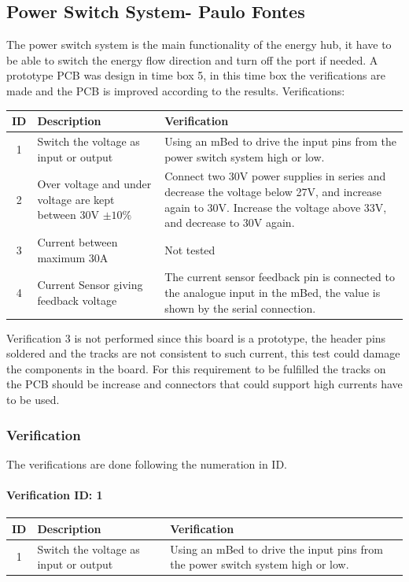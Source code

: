 \subsection{Power Switch System- Paulo Fontes}
The power switch system is the main functionality of the energy hub, it have to be able to switch the energy flow direction and turn off the port if needed. A prototype PCB was design in time box 5, in this time box the verifications are made and the PCB is improved according to the results.
\p
Verifications:
\begin{table}[H]
\centering
	\begin{tabular}{| c | l | p{7cm} | }
		\hline
		ID & Description & Verification \\\hline
		1 & Switch the voltage as input or output & Using an mBed to drive the input pins from the power switch system high or low. \\\hline
		2 & Over voltage and under voltage are kept between 30V $ \pm10\% $ & Connect two 30V power supplies in series and decrease the voltage below 27V, and increase again to 30V. Increase the voltage above 33V, and decrease to 30V again. \\\hline
		3 & Current between maximum 30A & Not tested \\\hline
		4 & Current Sensor giving feedback voltage & The current sensor feedback pin is connected to the analogue input in the mBed, the value is shown by the serial connection. \\\hline
	\end{tabular}
\end{table}

Verification 3 is not performed since this board is a prototype, the header pins soldered and the tracks are not consistent to such current, this test could damage the components in the board. For this requirement to be fulfilled the tracks on the PCB should be increase and connectors that could support high currents have to be used.

\subsubsection{Verification}
The verifications are done following the numeration in ID.

\paragraph{Verification ID: 1}
\begin{table}[H]
\centering
	\begin{tabular}{| c | l | p{7cm} | }
		\hline
		ID & Description & Verification \\\hline
		1 & Switch the voltage as input or output & Using an mBed to drive the input pins from the power switch system high or low. \\\hline
	\end{tabular}
\end{table}

